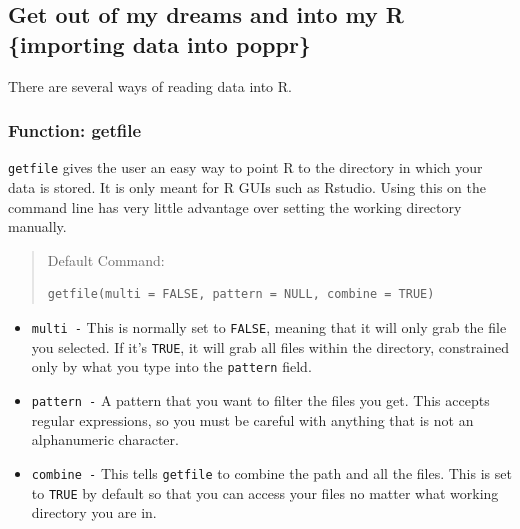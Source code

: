 \documentclass[letterpaper]{article}\usepackage[]{graphicx}\usepackage[]{color}
\makeatletter
\newenvironment{kframe}{%
 \def\at@end@of@kframe{}%
 \ifinner\ifhmode%
  \def\at@end@of@kframe{\end{minipage}}%
  \begin{minipage}{\columnwidth}%
 \fi\fi%
 \def\FrameCommand##1{\hskip\@totalleftmargin \hskip-\fboxsep
 \colorbox{shadecolor}{##1}\hskip-\fboxsep
     \hskip-\linewidth \hskip-\@totalleftmargin \hskip\columnwidth}%
 \MakeFramed {\advance\hsize-\width
   \@totalleftmargin\z@ \linewidth\hsize
   \@setminipage}}%
 {\par\unskip\endMakeFramed%
 \at@end@of@kframe}
\newenvironment{knitrout}{}{} %
\newcommand{\tab}{\hspace*{1em}}
\makeatother
\begin{document}
\subsection{Get out of my dreams and into my R \{importing data into poppr\}}
\label{intro:import}
There are several ways of reading data into R. 
\subsubsection{Function: getfile}
\label{intro:import:getfile}
\tab\tab \texttt{getfile} gives the user an easy way to point R to the directory in which your data is stored. It is only meant for R GUIs such as Rstudio. Using this on the command line has very little advantage over setting the working directory manually. 
\begin{quote}
Default Command:
\begin{knitrout}
\color{fgcolor}\begin{kframe}
\begin{verbatim}
getfile(multi = FALSE, pattern = NULL, combine = TRUE)
\end{verbatim}
\end{kframe}
\end{knitrout}

\end{quote}
\begin{itemize}
  \item \texttt{multi -} This is normally set to \texttt{FALSE}, meaning that it will only grab the file you selected. If it's \texttt{TRUE}, it will grab all files within the directory, constrained only by what you type into the \texttt{pattern} field.
  \item \texttt{pattern -} A pattern that you want to filter the files you get. This accepts regular expressions, so you must be careful with anything that is not an alphanumeric character.
  \item \texttt{combine -} This tells \texttt{getfile} to combine the path and all the files. This is set to \texttt{TRUE} by default so that you can access your files no matter what working directory you are in. 
\end{itemize}
\end{document}
